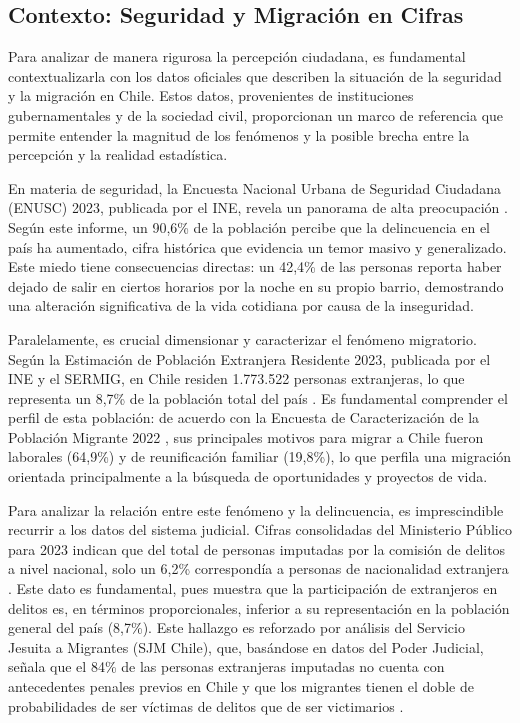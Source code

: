 \documentclass[12pt, a4paper]{article}
\begin{document}
\subsection{Contexto: Seguridad y Migración en Cifras}
Para analizar de manera rigurosa la percepción ciudadana, es fundamental contextualizarla con los datos oficiales que describen la situación de la seguridad y la migración en Chile. Estos datos, provenientes de instituciones gubernamentales y de la sociedad civil, proporcionan un marco de referencia que permite entender la magnitud de los fenómenos y la posible brecha entre la percepción y la realidad estadística.

En materia de seguridad, la Encuesta Nacional Urbana de Seguridad Ciudadana (ENUSC) 2023, publicada por el INE, revela un panorama de alta preocupación \autocite{INE2024enusc}. Según este informe, un 90,6\% de la población percibe que la delincuencia en el país ha aumentado, cifra histórica que evidencia un temor masivo y generalizado. Este miedo tiene consecuencias directas: un 42,4\% de las personas reporta haber dejado de salir en ciertos horarios por la noche en su propio barrio, demostrando una alteración significativa de la vida cotidiana por causa de la inseguridad.

Paralelamente, es crucial dimensionar y caracterizar el fenómeno migratorio. Según la Estimación de Población Extranjera Residente 2023, publicada por el INE y el SERMIG, en Chile residen 1.773.522 personas extranjeras, lo que representa un 8,7\% de la población total del país \autocite{INE2024estimacion}. Es fundamental comprender el perfil de esta población: de acuerdo con la Encuesta de Caracterización de la Población Migrante 2022 \autocite{SERMIG2023encuesta}, sus principales motivos para migrar a Chile fueron laborales (64,9\%) y de reunificación familiar (19,8\%), lo que perfila una migración orientada principalmente a la búsqueda de oportunidades y proyectos de vida.

Para analizar la relación entre este fenómeno y la delincuencia, es imprescindible recurrir a los datos del sistema judicial. Cifras consolidadas del Ministerio Público para 2023 indican que del total de personas imputadas por la comisión de delitos a nivel nacional, solo un 6,2\% correspondía a personas de nacionalidad extranjera \autocite{MP2023}. Este dato es fundamental, pues muestra que la participación de extranjeros en delitos es, en términos proporcionales, inferior a su representación en la población general del país (8,7\%). Este hallazgo es reforzado por análisis del Servicio Jesuita a Migrantes (SJM Chile), que, basándose en datos del Poder Judicial, señala que el 84\% de las personas extranjeras imputadas no cuenta con antecedentes penales previos en Chile y que los migrantes tienen el doble de probabilidades de ser víctimas de delitos que de ser victimarios \autocite{SJM2024seguridad}.
\end{document}
